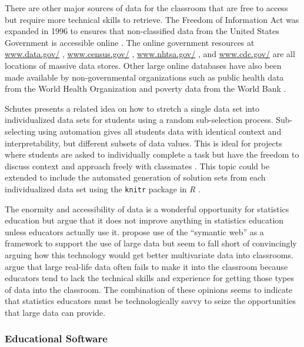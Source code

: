 \documentclass[11pt]{isuthesis}
\begin{document}
There are other major sources of data for the classroom that are free to access but require more technical skills to retrieve.  The Freedom of Information Act was expanded in 1996 to ensures that non-classified data from the United States Government is accessible online \citep{FOIA}.  The online government resources at \url{www.data.gov/} \citep{DataGov}, \url{www.census.gov/} \citep{Census}, \url{www.nhtsa.gov/} \citep{NHTSA}, and \url{www.cdc.gov/} \citep{CDC} are all locations of massive data stores. Other large online databases have also been made available by non-governmental organizations such as public health data from the World Health Organization \citep{WHO} and poverty data from the World Bank  \citep{WorldBank}.

Schutes presents a related idea on how to stretch a single data set into individualized data sets for students using a random sub-selection process. Sub-selecting using automation gives all students data with identical context and interpretability, but different subsets of data values. This is ideal for projects where  students are asked to individually complete a task but have the freedom to discuss  context and approach freely with classmates \citep{Schutes2009}.  This topic could be extended to include the automated generation of solution sets from each individualized data set using the \texttt{knitr} package in \textit{R} \citep{Yihui}.

The enormity and accessibility of  data is a wonderful opportunity for statistics education but \citet{Nicholson2013} argue that it does not improve anything in statistics education unless educators actually use it. \citet{Ridgeway2013} propose use of the ``symantic web'' as a framework to support the use of large data but seem to fall short of convincingly arguing how this technology would get better multivariate data into classrooms. \citet{Finzer2007} argue that large real-life data often fails to make it into the classroom because educators tend to lack the technical skills and experience for getting those types of data into the classroom. The combination of these opinions seems to indicate that statistics educators must be technologically savvy to seize the opportunities that large data can provide.

\subsubsection{Educational Software} 
\end{document}
